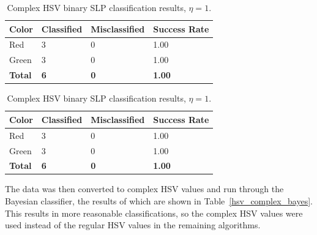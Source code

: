 \documentclass[twoside]{IEEEtran}
\begin{document}
\begin{table}[!b]
    \centering

    \begin{minipage}{\columnwidth}
        \centering
        \caption{RGB binary SLP classification results, \( \eta = 1 \).}%
        \label{rgb_binary_slp}
        \begin{tabular}{ l l l l }
            \toprule
            \bfseries Color & \bfseries Classified & \bfseries Misclassified & \bfseries Success Rate \\
            \midrule
            Red             & 3                    & 0                       & 1.00                   \\
            Green           & 3                    & 0                       & 1.00                   \\
            \midrule
            \bfseries Total & \bfseries 6          & \bfseries 0             & \bfseries 1.00         \\
            \bottomrule
        \end{tabular}
    \end{minipage}%
    \begin{minipage}{\columnwidth}
        \centering
        \caption{Complex HSV binary SLP classification results, \( \eta = 1 \).}%
        \label{hsv_binary_slp}
        \begin{tabular}{ l l l l }
            \toprule
            \bfseries Color & \bfseries Classified & \bfseries Misclassified & \bfseries Success Rate \\
            \midrule
            Red             & 3                    & 0                       & 1.00                   \\
            Green           & 3                    & 0                       & 1.00                   \\
            \midrule
            \bfseries Total & \bfseries 6          & \bfseries 0             & \bfseries 1.00         \\
            \bottomrule
        \end{tabular}
    \end{minipage}
\end{table}

The data was then converted to complex HSV values and run through the Bayesian classifier, the
results of which are shown in Table~\ref{hsv_complex_bayes}. This results in more reasonable classifications, so the
complex HSV values were used instead of the regular HSV values in the remaining algorithms.
\end{document}
